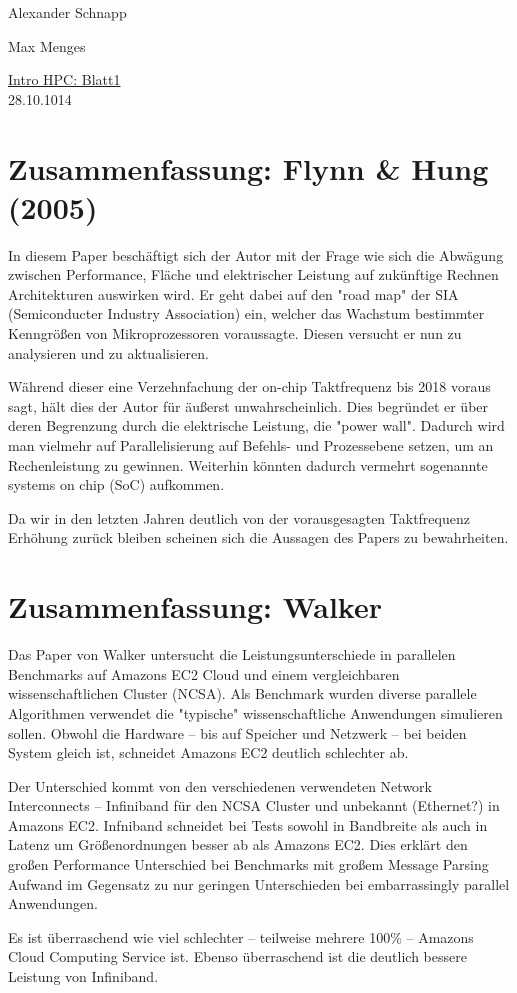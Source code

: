 \documentclass[a4paper,11pt]{scrartcl}
\begin{document}
\hfill Alexander Schnapp

\hfill Max Menges\\

\begin{center}
\underline{\Huge{Intro HPC: Blatt1}}\\
\large{28.10.1014}\\
\end{center}

\section{Zusammenfassung: Flynn \& Hung (2005) }
In diesem Paper beschäftigt sich der Autor mit der Frage wie sich die Abwägung zwischen Performance, Fläche und elektrischer Leistung auf zukünftige Rechnen Architekturen auswirken wird. Er geht dabei auf den "road map" der SIA (Semiconducter Industry Association) ein, welcher das Wachstum bestimmter Kenngrößen von Mikroprozessoren voraussagte. Diesen versucht er nun zu analysieren und zu aktualisieren.

 Während dieser eine Verzehnfachung der on-chip Taktfrequenz bis 2018 voraus sagt, hält dies der Autor für äußerst unwahrscheinlich. Dies begründet er über deren Begrenzung durch die elektrische Leistung, die "power wall". Dadurch wird man vielmehr auf Parallelisierung auf Befehls- und Prozessebene setzen, um an Rechenleistung zu gewinnen. Weiterhin könnten dadurch vermehrt sogenannte systems on chip (SoC) aufkommen.
 
Da wir in den letzten Jahren deutlich von der vorausgesagten Taktfrequenz Erhöhung zurück bleiben scheinen sich die Aussagen des Papers zu bewahrheiten.
\section{Zusammenfassung: Walker}

Das Paper von Walker untersucht die Leistungsunterschiede in parallelen Benchmarks auf Amazons EC2 Cloud und einem vergleichbaren wissenschaftlichen Cluster (NCSA). Als Benchmark wurden diverse parallele Algorithmen verwendet die "typische" wissenschaftliche Anwendungen simulieren sollen. Obwohl die Hardware -- bis auf Speicher und Netzwerk -- bei beiden System gleich ist, schneidet Amazons EC2 deutlich schlechter ab. 

Der Unterschied kommt von den verschiedenen verwendeten Network Interconnects -- Infiniband für den NCSA Cluster und unbekannt (Ethernet?) in Amazons EC2. Infniband schneidet bei Tests sowohl in Bandbreite als auch in Latenz um Größenordnungen besser ab als Amazons EC2. Dies erklärt den großen Performance Unterschied bei Benchmarks mit großem Message Parsing Aufwand im Gegensatz zu nur geringen Unterschieden bei embarrassingly parallel Anwendungen. 

Es ist überraschend wie viel schlechter -- teilweise mehrere 100\% -- Amazons Cloud Computing Service ist. Ebenso überraschend ist die deutlich bessere Leistung von Infiniband. 
\end{document}
